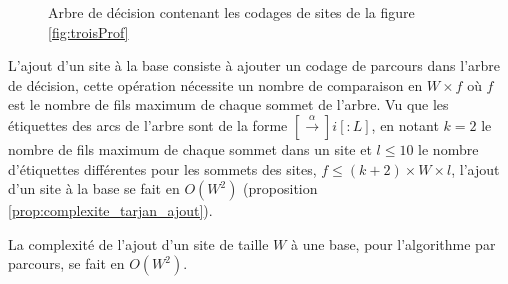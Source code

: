 \begin{figure}[h]
\begin{center}
\end{center}
\caption{Arbre de décision contenant les codages de sites de la figure \ref{fig:troisProf}}
\label{fig:arbreDecTarjan}
\end{figure}

L'ajout d'un site à la base consiste à ajouter un codage de parcours dans l'arbre de décision, cette opération nécessite un nombre de comparaison en $W\times f$ où $f$ est le nombre de fils maximum de chaque sommet de l'arbre. 
Vu que les étiquettes des arcs de l'arbre sont de la forme $[\xrightarrow{\alpha}]i[:L]$, en notant $k=2$ le nombre de fils maximum de chaque sommet dans un site et $l\leq 10$ le nombre d'étiquettes différentes pour les sommets des sites, $f\leq (k+2)\times W\times l$, l'ajout d'un site à la base se fait en $O(W^2)$ (proposition \ref{prop:complexite_tarjan_ajout}).

\begin{prop}
 La complexité de l'ajout d'un site de taille $W$ à une base, pour l'algorithme par parcours, se fait en $O(W^2)$.
\label{prop:complexite_tarjan_ajout}
\end{prop}


